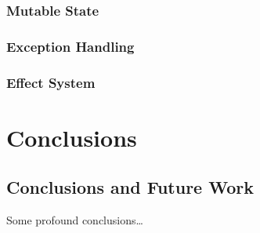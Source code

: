 \documentclass[11pt,phd,lfcs,twoside,openright,logo,leftchapter,normalheadings]{infthesis}
\begin{document}
\section{Mutable State}
\section{Exception Handling}
\section{Effect System}

\part{Conclusions}

\chapter{Conclusions and Future Work}
\label{ch:conclusions}
Some profound conclusions\dots


\singlespace
\nocite{*}



\end{document}
